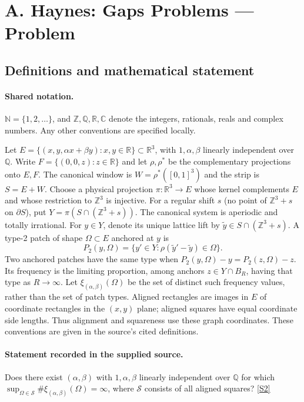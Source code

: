 \documentclass[11pt]{article}
\newcommand{\sref}[2]{\hyperlink{source:#1:#2}{[S#2]}}
\begin{document}
\section{A. Haynes: Gaps Problems — Problem}\label{statement}

\subsection{Definitions and mathematical statement}

\paragraph{Shared notation.}$\mathbb N=\{1,2,\ldots\}$, and $\mathbb Z,\mathbb Q,\mathbb R,\mathbb C$ denote the integers, rationals, reals and complex numbers. Any other conventions are specified locally.


Let $E=\{(x,y,\alpha x+\beta y):x,y\in\mathbb R\}\subset\mathbb R^3$, with $1,\alpha,\beta$ linearly independent over $\mathbb Q$. Write $F=\{(0,0,z):z\in\mathbb R\}$ and let $\rho,\rho^*$ be the complementary projections onto $E,F$. The canonical window is $W=\rho^*([0,1]^3)$ and the strip is $S=E+W$. Choose a physical projection $\pi:\mathbb R^3\to E$ whose kernel complements $E$ and whose restriction to $\mathbb Z^3$ is injective. For a regular shift $s$ (no point of $\mathbb Z^3+s$ on $\partial S$), put $Y=\pi(S\cap(\mathbb Z^3+s))$. The canonical system is aperiodic and totally irrational. For $y\in Y$, denote its unique lattice lift by $\widetilde y\in S\cap(\mathbb Z^3+s)$. A type-2 patch of shape $\Omega\subset E$ anchored at $y$ is
\[P_2(y,\Omega)=\{y'\in Y:\rho(\widetilde y'-\widetilde y)\in\Omega\}.\]
Two anchored patches have the same type when $P_2(y,\Omega)-y=P_2(z,\Omega)-z$. Its frequency is the limiting proportion, among anchors $z\in Y\cap B_R$, having that type as $R\to\infty$. Let $\xi_{(\alpha,\beta)}(\Omega)$ be the set of distinct such frequency values, rather than the set of patch types. Aligned rectangles are images in $E$ of coordinate rectangles in the $(x,y)$ plane; aligned squares have equal coordinate side lengths. Thus alignment and squareness use these graph coordinates. These conventions are given in the source’s cited definitions.
\paragraph{Statement recorded in the supplied source.}
Does there exist $(\alpha,\beta)$ with $1,\alpha,\beta$ linearly independent over $\mathbb Q$ for which $\sup_{\Omega\in\mathcal S}\#\xi_{(\alpha,\beta)}(\Omega)=\infty$, where $\mathcal S$ consists of all aligned squares? \sref{statement}{2}
\end{document}
